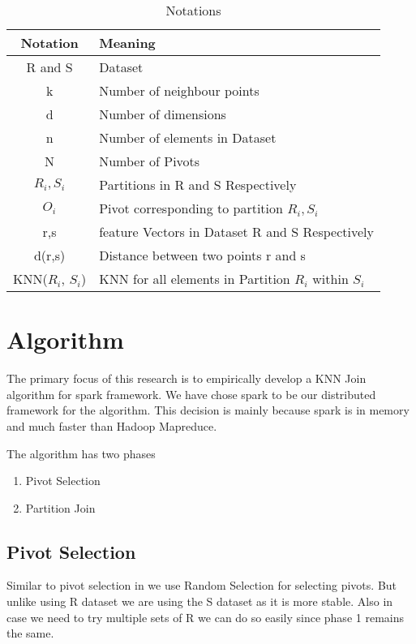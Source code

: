 \documentclass[conference]{IEEEtran}
\begin{document}
\begin{table}[!t]
\caption{Notations}
\label{notations}
\centering
\begin{tabular}{|c|l|}
\hline
Notation & Meaning \\
\hline
R and S & Dataset\\

k & Number of neighbour points \\

d & Number of dimensions \\

n & Number of elements in Dataset \\

N & Number of Pivots \\

$R_i, S_i$ & Partitions in R and S Respectively \\

$O_i$ & Pivot corresponding to partition $R_i, S_i$ \\

r,s & feature Vectors in Dataset R and S Respectively \\

d(r,s) & Distance between two points r and s \\

KNN($R_i$, $S_i$) & KNN for all elements in Partition $R_i$ within
                    $S_i$ \\
\hline
\end{tabular}
\end{table}


\bigskip

\section{Algorithm}
The primary focus of this research is to empirically develop a KNN
Join algorithm for spark framework. We have chose spark to be our
distributed framework for the algorithm. This decision is mainly
because spark is in memory and much faster than Hadoop Mapreduce.

\bigskip

The algorithm has two phases
\begin{enumerate}
\item Pivot Selection
\item Partition Join
\end{enumerate}

\subsection{Pivot Selection}
Similar to pivot selection in \cite{lu_efficient_2012} we use Random
Selection for selecting pivots. But unlike using R dataset we are
using the S dataset as it is more stable. Also in case we need to try
multiple sets of R we can do so easily since phase 1 remains the
same.
\end{document}
